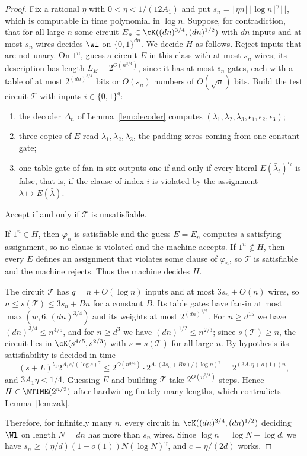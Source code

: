 \begin{proof}
Fix a rational $\eta$ with $0<\eta<1/(12A_1)$ and put
$s_n=\lfloor\eta n\lfloor\lfloor\log n\rfloor^\gamma\rfloor\rfloor$, which is
computable in time polynomial in $\log n$. Suppose,
for contradiction, that for all large $n$ some circuit $E_n\in\cK((dn)^{3/4},
(dn)^{1/2})$ with $dn$ inputs and at most $s_n$ wires decides $\Wl$ on
$\{0,1\}^{dn}$. We decide $H$ as follows. Reject inputs that are not unary. On
$1^n$, guess a circuit $E$ in this class with at most $s_n$ wires; its
description has length $L_E=2^{O(n^{3/4})}$, since it has at most $s_n$ gates,
each with a table of at most $2^{(dn)^{3/4}}$ bits or $O(s_n)$ numbers of
$O(\sqrt n)$ bits. Build the test circuit $\mathcal T$ with inputs
$i\in\{0,1\}^q$:
\begin{enumerate}[label=\textup{(\arabic*)},leftmargin=2em]
\item the decoder $\Delta_n$ of Lemma~\ref{lem:decoder} computes
$(\lambda_1,\lambda_2,\lambda_3,\epsilon_1,\epsilon_2,\epsilon_3)$;
\item three copies of $E$ read $\bar\lambda_1,\bar\lambda_2,\bar\lambda_3$, the
padding zeros coming from one constant gate;
\item one table gate of fan-in six outputs one if and only if every literal
$E(\bar\lambda_t)^{\epsilon_t}$ is false, that is, if the clause of index $i$ is
violated by the assignment $\lambda\mapsto E(\bar\lambda)$.
\end{enumerate}
Accept if and only if $\mathcal T$ is unsatisfiable.

If $1^n\in H$, then $\varphi_n$ is satisfiable and the guess $E=E_n$ computes a
satisfying assignment, so no clause is violated and the machine accepts. If
$1^n\notin H$, then every $E$ defines an assignment that violates some clause of
$\varphi_n$, so $\mathcal T$ is satisfiable and the machine rejects. Thus the
machine decides $H$.

The circuit $\mathcal T$ has $q=n+O(\log n)$ inputs and at most
$3s_n+O(n)$ wires, so $n\le s(\mathcal T)\le3s_n+B n$ for a constant $B$. Its
table gates have fan-in at most $\max(w,6,(dn)^{3/4})$ and its weights at most
$2^{(dn)^{1/2}}$. For $n\ge d^{15}$ we have $(dn)^{3/4}\le n^{4/5}$, and for
$n\ge d^3$ we have $(dn)^{1/2}\le n^{2/3}$; since $s(\mathcal T)\ge n$, the
circuit lies in $\cK(s^{4/5},s^{2/3})$ with $s=s(\mathcal T)$ for all large $n$.
By hypothesis its satisfiability is decided in time
\[
(s+L)^{b_1}2^{A_1s/(\log s)^\gamma}
\le2^{O(n^{3/4})}\cdot2^{A_1(3s_n+Bn)/(\log n)^\gamma}
=2^{(3A_1\eta+o(1))n},
\]
and $3A_1\eta<1/4$. Guessing $E$ and building $\mathcal T$ take
$2^{O(n^{3/4})}$ steps. Hence $H\in\NTIME(2^{n/2})$ after hardwiring finitely
many lengths, which contradicts Lemma~\ref{lem:zak}.

Therefore, for infinitely many $n$, every circuit in
$\cK((dn)^{3/4},(dn)^{1/2})$ deciding $\Wl$ on length $N=dn$ has more than $s_n$
wires. Since $\log n=\log N-\log d$, we have $s_n\ge(\eta/d)(1-o(1))N(\log
N)^\gamma$, and $c=\eta/(2d)$ works.
\end{proof}

